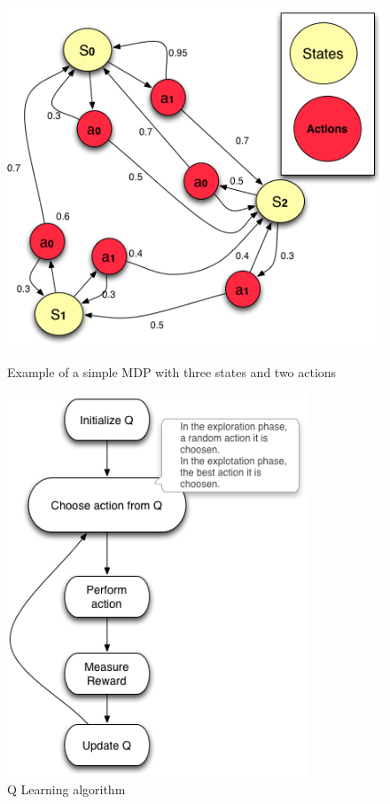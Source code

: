 \begin{figure}
\begin{minipage}{.5\textwidth}
\centering
\includegraphics[width=1\textwidth]{./images/mdp1.png}
\caption{Example of a simple MDP with three states and two actions}
\label{fig:mdp}
\end{minipage}
\begin{minipage}{.5\textwidth}
\centering
\includegraphics[width=0.8\textwidth]{./images/qalgo.png}
\caption{Q Learning algorithm}
\label{fig:qalgo}
\end{minipage}
\end{figure}



